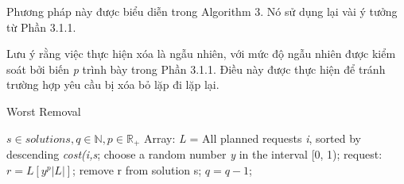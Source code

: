 Phương pháp này được biểu diễn trong Algorithm 3. Nó sử dụng lại vài ý tưởng từ Phần 3.1.1.

Lưu ý rằng việc thực hiện xóa là ngẫu nhiên, với mức độ ngẫu nhiên được kiểm soát bởi biến \textit{p} trình bày trong Phần 3.1.1. Điều này được thực hiện để tránh trường hợp yêu cầu bị xóa bỏ lặp đi lặp lại.

\begin{algorithm}
    \caption{Worst Removal} 
	\begin{algorithmic}[1]
        \Require $s \in {solutions}, q \in \mathbb{N}, p \in \mathbb{R}_{+}$
		  \State Array: \textit{L} = All planned requests \textit{i}, sorted by descending \textit{cost(i,s};
            \State choose a random number \textit{y} in the interval [0, 1);
            \State request: $r = L\left[ y^p |L| \right]$;
            \State remove r from solution s;
            \State $q = q-1$;
        \EndWhile
	\end{algorithmic} 
\end{algorithm}